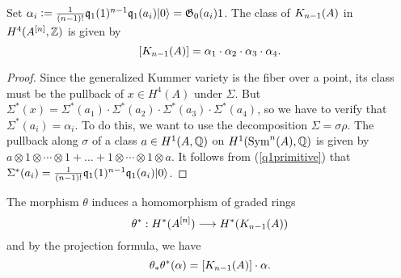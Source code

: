 \begin{proposition}\label{KummerClass}
Set $\alpha_i \defIs  \frac{1}{(n-1)!}\kq_{1}(1)^{n-1}\kq_1(a_i)\vac = \G_0(a_i)1$. The class of %
$\kum{A}{n-1}$ in $H^4(A\hilb{n},\Z)$ is given by
$$
[\kum{A}{n-1}]=\alpha_1\cdot\alpha_2\cdot\alpha_3\cdot\alpha_4.
$$ 
\end{proposition}
\begin{proof}
Since the generalized Kummer variety is the fiber over a point, its 
class must be the pullback of $x\in H^4(A)$ under $\Sigma$. But $\Sigma^* (x) = \Sigma^*(a_1)\cdot \Sigma^*(a_2)\cdot \Sigma^*(a_3)\cdot \Sigma^*(a_4)$, so we have to verify that $\Sigma^* (a_i) = \alpha_i$. To do this, we want to use the decomposition $\Sigma = \sigma\rho$.
The pullback along $\sigma$ of a class $a\in H^1(A,\Q)$ on $H^1(\Sym^n(A),\Q)$ 
is given by $a\otimes 1\otimes \cdots\otimes 1 + \ldots + 1\otimes \cdots\otimes 1\otimes a$. It follows from (\ref{q1primitive}) that $\Sigma^* (a_i) = \frac{1}{(n-1)!}\kq_{1}(1)^{n-1}\kq_1(a_i)\vac $.
\end{proof}
The morphism $\theta$ induces a homomorphism of graded rings
\begin{equation}
\theta^* :H^*(A\hilb{n})\longrightarrow H^*(\kum{A}{n-1})
\end{equation}
and by the projection formula, we have
\begin{equation}
\theta_*\theta^*(\alpha)  = [\kum{A}{n-1}]\cdot\alpha.
\end{equation}

